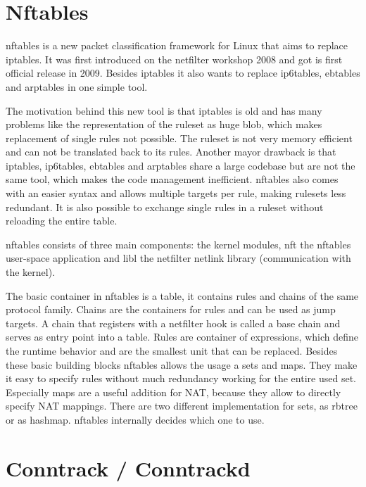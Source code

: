 \documentclass{report}
\begin{document}
\section{Nftables}\label{nftables}

nftables\cite{nftables}\cite{nftables2}\cite{nftables3} is a new packet classification framework for Linux that aims to
replace iptables. It was first introduced on the netfilter workshop 2008
and got is first official release in 2009. Besides iptables it also
wants to replace ip6tables, ebtables and arptables in one simple tool.

The motivation behind this new tool is that iptables is old and has many
problems like the representation of the ruleset as huge blob, which
makes replacement of single rules not possible. The ruleset is not very
memory efficient and can not be translated back to its rules. Another
mayor drawback is that iptables, ip6tables, ebtables and arptables share
a large codebase but are not the same tool, which makes the code
management inefficient. nftables also comes with an easier syntax and
allows multiple targets per rule, making rulesets less redundant. It is
also possible to exchange single rules in a ruleset without reloading
the entire table.

nftables consists of three main components: the kernel modules, nft the
nftables user-space application and libl the netfilter netlink library
(communication with the kernel).

The basic container in nftables is a table, it contains rules and chains
of the same protocol family. Chains are the containers for rules and can
be used as jump targets. A chain that registers with a netfilter hook is
called a base chain and serves as entry point into a table. Rules are
container of expressions, which define the runtime behavior and are the
smallest unit that can be replaced. Besides these basic building blocks
nftables allows the usage a sets and maps. They make it easy to specify
rules without much redundancy working for the entire used set.
Especially maps are a useful addition for NAT, because they allow to
directly specify NAT mappings. There are two different implementation
for sets, as rbtree or as hashmap. nftables internally decides which one
to use.

\section{Conntrack / Conntrackd}\label{conntrack-conntrackd}
\end{document}
